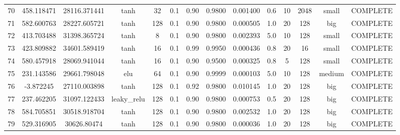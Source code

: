 \begin{longtable}{cccccccccccccc}
                       70 &                 458.118471 &                       28116.371441 &            tanh &          32 &         0.1 &        0.90 & 0.9800 &       0.001400 &             0.6 &        10 &     2048 &     small & COMPLETE \\
                       71 &                 582.600763 &                       28227.605721 &            tanh &         128 &         0.1 &        0.90 & 0.9800 &       0.000505 &             1.0 &        20 &      128 &       big & COMPLETE \\
                       72 &                 413.703488 &                       31398.365724 &            tanh &           8 &         0.1 &        0.90 & 0.9800 &       0.002393 &             5.0 &        10 &      128 &     small & COMPLETE \\
                       73 &                 423.809882 &                       34601.589419 &            tanh &          16 &         0.1 &        0.99 & 0.9950 &       0.000436 &             0.8 &        20 &       16 &     small & COMPLETE \\
                       74 &                 580.457918 &                       28069.941044 &            tanh &          16 &         0.1 &        0.90 & 0.9500 &       0.000325 &             0.8 &         5 &      128 &     small & COMPLETE \\
                       75 &                 231.143586 &                       29661.798048 &             elu &          64 &         0.1 &        0.90 & 0.9999 &       0.000103 &             5.0 &        10 &      128 &    medium & COMPLETE \\
                       76 &                  -3.872245 &                       27110.003898 &            tanh &         128 &         0.1 &        0.92 & 0.9800 &       0.010145 &             1.0 &        20 &      128 &       big & COMPLETE \\
                       77 &                 237.462205 &                       31097.122433 &     leaky\_relu &         128 &         0.1 &        0.90 & 0.9800 &       0.000753 &             0.5 &        20 &      128 &       big & COMPLETE \\
                       78 &                 584.705851 &                       30518.918704 &            tanh &         128 &         0.1 &        0.90 & 0.9800 &       0.002532 &             1.0 &        20 &      128 &       big & COMPLETE \\
                       79 &                 529.316905 &                        30626.80474 &            tanh &         128 &         0.1 &        0.90 & 0.9800 &       0.000036 &             1.0 &        20 &      128 &       big & COMPLETE \\

\end{longtable}
